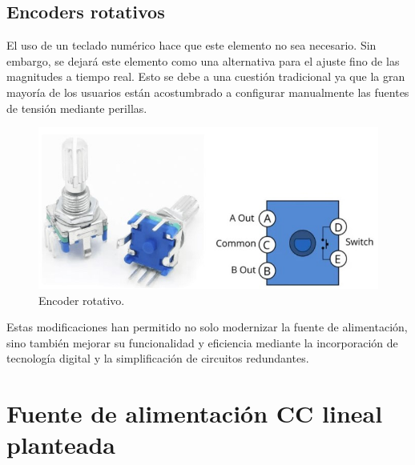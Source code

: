 \subsection{Encoders rotativos}\par 
El uso de un teclado numérico hace que este elemento no sea necesario. Sin embargo, se dejará este elemento como una alternativa para el ajuste fino de las magnitudes a tiempo real. Esto se debe a una cuestión tradicional ya que la gran mayoría de los usuarios están acostumbrado a configurar manualmente las fuentes de tensión mediante perillas.\par
\begin{figure}[H]
    \centering
    \includegraphics[scale=0.5]{./imagenes/encoder_rotativo.jpg}
    \caption{Encoder rotativo.}
    \label{F:encoder_rotativo}
\end{figure}
\par 
Estas modificaciones han permitido no solo modernizar la fuente de alimentación, sino también mejorar su funcionalidad y eficiencia mediante la incorporación de tecnología digital y la simplificación de circuitos redundantes. 

\section{Fuente de alimentación CC lineal planteada}

